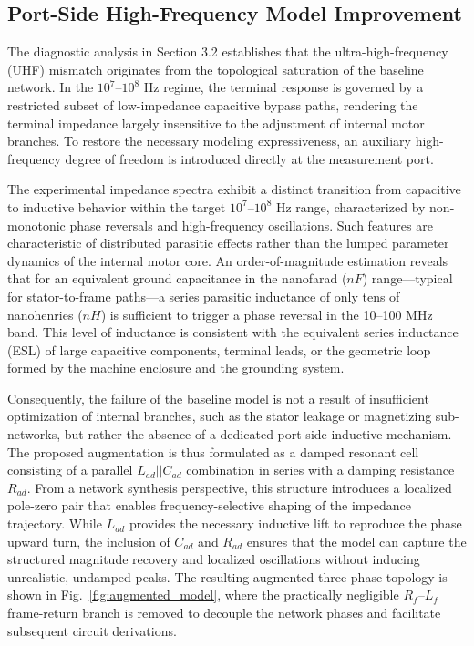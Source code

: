 \documentclass[12pt,a4paper]{article}
\begin{document}
\subsection{Port-Side High-Frequency Model Improvement}

The diagnostic analysis in Section 3.2 establishes that the ultra-high-frequency (UHF) mismatch originates from the topological saturation of the baseline network. In the $10^7$–$10^8$ Hz regime, the terminal response is governed by a restricted subset of low-impedance capacitive bypass paths, rendering the terminal impedance largely insensitive to the adjustment of internal motor branches\cite{ref8,ref16,ref20,ref21,ref24,ref45}. To restore the necessary modeling expressiveness, an auxiliary high-frequency degree of freedom is introduced directly at the measurement port.

The experimental impedance spectra exhibit a distinct transition from capacitive to inductive behavior within the target $10^7$–$10^8$ Hz range, characterized by non-monotonic phase reversals and high-frequency oscillations. Such features are characteristic of distributed parasitic effects rather than the lumped parameter dynamics of the internal motor core. An order-of-magnitude estimation reveals that for an equivalent ground capacitance in the nanofarad ($nF$) range—typical for stator-to-frame paths—a series parasitic inductance of only tens of nanohenries ($nH$) is sufficient to trigger a phase reversal in the 10–100 MHz band. This level of inductance is consistent with the equivalent series inductance (ESL) of large capacitive components, terminal leads, or the geometric loop formed by the machine enclosure and the grounding system.

Consequently, the failure of the baseline model is not a result of insufficient optimization of internal branches, such as the stator leakage or magnetizing sub-networks, but rather the absence of a dedicated port-side inductive mechanism. The proposed augmentation is thus formulated as a damped resonant cell consisting of a parallel $L_{ad} || C_{ad}$ combination in series with a damping resistance $R_{ad}$. From a network synthesis perspective, this structure introduces a localized pole-zero pair that enables frequency-selective shaping of the impedance trajectory. While $L_{ad}$ provides the necessary inductive lift to reproduce the phase upward turn, the inclusion of $C_{ad}$ and $R_{ad}$ ensures that the model can capture the structured magnitude recovery and localized oscillations without inducing unrealistic, undamped peaks. The resulting augmented three-phase topology is shown in Fig.~\ref{fig:augmented_model}, where the practically negligible $R_f$--$L_f$ frame-return branch is removed to decouple the network phases and facilitate subsequent circuit derivations.
\end{document}
